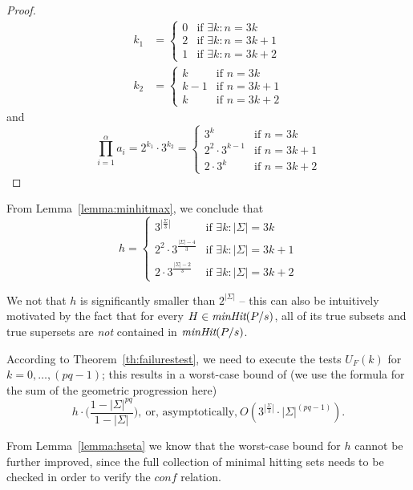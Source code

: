 \begin{proof}
\begin{align*}
k_1&=
\begin{cases} 
0 &\text{if}\,\, \exists k: n=3k\\ 
2 &\text{if}\,\, \exists k: n=3k+1\\
1 &\text{if}\,\, \exists k: n=3k+2
\end{cases}\\
 k_2&=
 \begin{cases} 
 k &\text{if}\,\, n=3k\\ 
 k-1 &\text{if}\,\, n=3k+1\\
 k &\text{if}\,\, n=3k+2\end{cases}
\end{align*}
% 
 and  
 $$
 \prod_{i=1}^{\alpha}a_i=2^{k_1}\cdot 3^{k_2}=
 \begin{cases} 
 3^k &\text{if}\,\,  n=3k\\ 
 2^2\cdot 3^{k-1} &\text{if}\,\,   n=3k+1\\
 2\cdot 3^{k} &\text{if}\,\,  n=3k+2\end{cases}
 $$
 \xbox
 \end{proof}
%
From Lemma~\ref{lemma:minhitmax}, we conclude that 
$$h=\begin{cases} 
3^{|\frac{\Sigma}{3}|} &\text{if}\,\, \exists k: |\Sigma|=3k\\ 
2^2\cdot 3^{\frac{|\Sigma|-4}{3}} &\text{if}\,\, \exists k : |\Sigma| =3k+1\\
2\cdot 3^{\frac{|\Sigma| - 2}{3}} &\text{if}\,\, \exists k: |\Sigma| =3k+2
\end{cases}
$$

We not that $h$ is significantly smaller than $2^{|\Sigma|}$ -- this can also be intuitively motivated by the fact that  for every $H\in  \text{\it minHit}(P/s)$, all of its true subsets and true supersets are {\it not} contained in $\text{\it minHit}(P/s)$. 

According to Theorem~\ref{th:failurestest},
we need to execute the tests $U_F(k)$
for $k = 0,\dots,(pq-1)$; this results in a worst-case bound
of (we use the formula for the sum of the geometric progression here)
\[
h\cdot \big( \frac{1-|\Sigma|^{pq}}{1-|\Sigma|} \big),\
 \text{or, asymptotically,}\  O(3^{|\frac{\Sigma}{3}|}\cdot|\Sigma|^{(pq-1)}).
 \]

From Lemma~\ref{lemma:hseta} we know that 
 the worst-case bound for $h$   cannot be further improved, since 
the full collection of minimal hitting sets needs to be checked in order to verify
the $conf$ relation.




